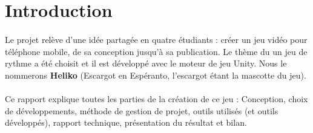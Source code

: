 \section{Introduction}

\paragraph{}
Le projet relève d'une idée partagée en quatre étudiants : créer un jeu vidéo pour téléphone mobile, de sa conception jusqu'à sa publication. Le thème du un jeu de rythme a été choisit et il est développé avec le moteur de jeu Unity. Nous le nommerons \textbf{Heliko} (Escargot en Espéranto, l'escargot étant la mascotte du jeu).

\paragraph{}
Ce rapport explique toutes les parties de la création de ce jeu : Conception, choix de développements, méthode de gestion de projet, outils utilisés (et outils développés), rapport technique, présentation du résultat et bilan.
